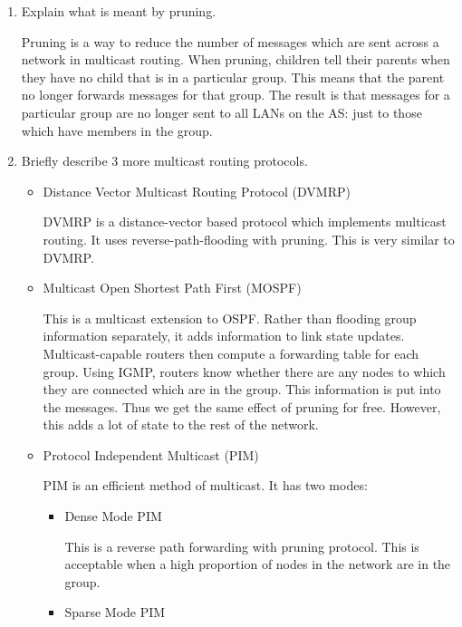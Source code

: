 \documentclass[10pt,\jkfside,a4paper]{article}
\begin{document}
\begin{enumerate}
    \item Explain what is meant by pruning.

    Pruning is a way to reduce the number of messages which are sent across a network in multicast routing. When pruning, children tell their parents when they have no child that is in a particular group. This
    means that the parent no longer forwards messages for that group. The result is that messages for a particular group are no longer sent to all LANs on the AS: just to those which have members in the group.

    \item Briefly describe 3 more multicast routing protocols.

    \begin{itemize}

        \item Distance Vector Multicast Routing Protocol (DVMRP)

        DVMRP is a distance-vector based protocol which implements multicast routing. It uses reverse-path-flooding with pruning. This is very similar to DVMRP\@.

        \item Multicast Open Shortest Path First (MOSPF)

        This is a multicast extension to OSPF\@. Rather than flooding group information separately, it adds information to link state updates. Multicast-capable routers then compute a forwarding table for each
        group. Using IGMP, routers know whether there are any nodes to which they are connected which are in the group. This information is put into the messages. Thus we get the same effect of pruning for free.
        However, this adds a lot of state to the rest of the network.

        \item Protocol Independent Multicast (PIM)

        PIM is an efficient method of multicast. It has two modes:

        \begin{itemize}

            \item Dense Mode PIM

            This is a reverse path forwarding with pruning protocol. This is acceptable when a high proportion of nodes in the network are in the group.

            \item Sparse Mode PIM


\end{itemize}
\end{itemize}
\end{enumerate}
\end{document}
